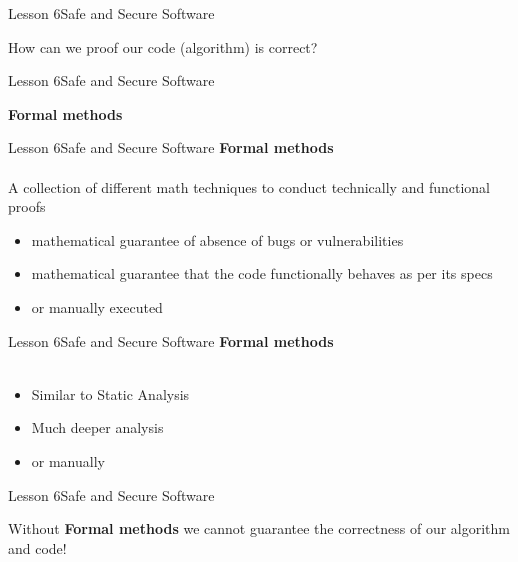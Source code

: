 \documentclass[aspectratio=1610]{beamer}
\begin{document}
\begin{frame}{Lesson 6}{Safe and Secure Software}
\Huge
\begin{center}
How can we proof our code (algorithm) is correct?
\end{center}
\end{frame}


\begin{frame}{Lesson 6}{Safe and Secure Software}
\Huge
\begin{center}
\textbf{Formal methods}
\end{center}
\end{frame}


\begin{frame}{Lesson 6}{Safe and Secure Software}
\LARGE
\textbf{Formal methods}\\~\\
A collection of different math techniques to conduct technically and functional proofs
\begin{itemize}
    \item mathematical guarantee of absence of bugs or vulnerabilities
    \item mathematical guarantee that the code functionally behaves as per its specs
    \item or manually executed
\end{itemize}
\end{frame}



\begin{frame}{Lesson 6}{Safe and Secure Software}
\LARGE
\textbf{Formal methods}\\~\\
\begin{itemize}
    \item Similar to Static Analysis
    \item Much deeper analysis
    \item or manually 
\end{itemize}
\end{frame}


\begin{frame}{Lesson 6}{Safe and Secure Software}
\Huge
\begin{center}
Without \textbf{Formal methods} we cannot guarantee the correctness of our algorithm
and code!
\end{center}
\end{frame}
\end{document}

